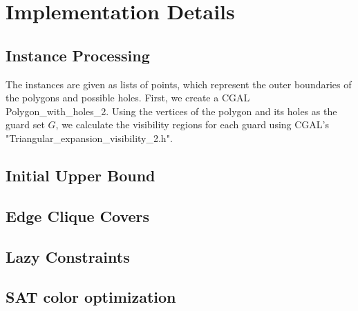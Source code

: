 \chapter{Implementation Details}

\section{Instance Processing}
The instances are given as lists of points, which represent the outer boundaries of the polygons and possible holes. First, we create a CGAL Polygon\_with\_holes\_2. Using the vertices of the polygon and its holes as the guard set $G$, we calculate the visibility regions for each guard using CGAL's "Triangular\_expansion\_visibility\_2.h". 

\section{Initial Upper Bound}

\section{Edge Clique Covers}

\section{Lazy Constraints}

\section{SAT color optimization}